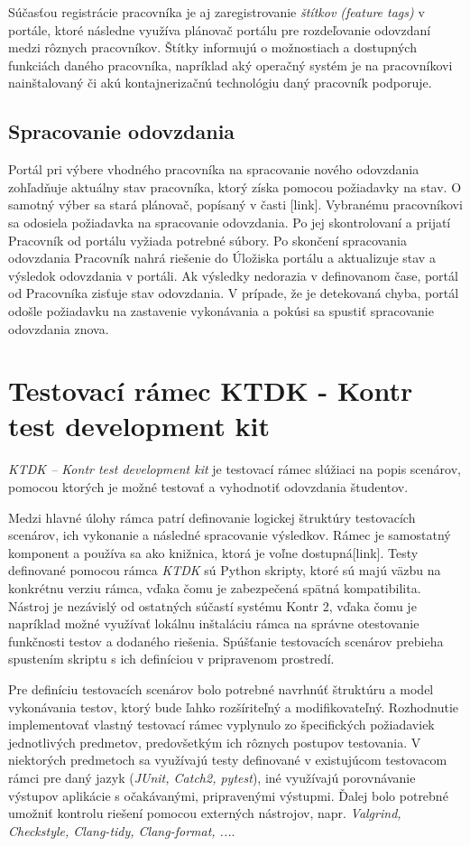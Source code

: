\documentclass[
  digital, %
  twoside, %
  table,   %
  lof,     %
  lot,     %
]{fithesis3}
\begin{document}
Súčasťou registrácie pracovníka je aj zaregistrovanie \emph{štítkov (feature tags)} v portále, ktoré následne využíva plánovač portálu pre rozdeľovanie odovzdaní medzi rôznych pracovníkov. Štítky informujú o možnostiach a dostupných funkciách daného pracovníka, napríklad aký operačný systém je na pracovníkovi nainštalovaný či akú kontajnerizačnú technológiu daný pracovník podporuje. 

\subsection{Spracovanie odovzdania}
Portál pri výbere vhodného pracovníka na spracovanie nového odovzdania zohľadňuje aktuálny stav pracovníka, ktorý získa pomocou požiadavky na stav. O samotný výber sa stará plánovač, popísaný v časti [link]. Vybranému pracovníkovi sa odosiela požiadavka na spracovanie odovzdania. Po jej skontrolovaní a prijatí Pracovník od portálu vyžiada potrebné súbory. Po skončení spracovania odovzdania Pracovník nahrá riešenie do Úložiska portálu a aktualizuje stav a výsledok odovzdania v portáli. Ak výsledky nedorazia v definovanom čase, portál od Pracovníka zisťuje stav odovzdania. V prípade, že je detekovaná chyba, portál odošle požiadavku na zastavenie vykonávania a pokúsi sa spustiť spracovanie odovzdania znova. 

\section{Testovací rámec KTDK - Kontr test development kit}

\emph{KTDK -- Kontr test development kit} je testovací rámec slúžiaci na popis scenárov, pomocou ktorých je možné testovať a vyhodnotiť odovzdania študentov.

Medzi hlavné úlohy rámca patrí definovanie logickej štruktúry testovacích scenárov, ich vykonanie a následné spracovanie výsledkov. Rámec je samostatný komponent a používa sa ako knižnica, ktorá je voľne dostupná[link]. Testy definované pomocou rámca \emph{KTDK} sú Python skripty, ktoré sú majú väzbu na konkrétnu verziu rámca, vďaka čomu je zabezpečená spätná kompatibilita. Nástroj je nezávislý od ostatných súčastí systému Kontr 2, vďaka čomu je napríklad možné využívať lokálnu inštaláciu rámca na správne otestovanie funkčnosti testov a dodaného riešenia. Spúšťanie testovacích scenárov prebieha spustením skriptu s ich definíciou v pripravenom prostredí. %

Pre definíciu testovacích scenárov bolo potrebné navrhnúť štruktúru a model vykonávania testov, ktorý bude ľahko rozšíriteľný a modifikovateľný. Rozhodnutie implementovať vlastný testovací rámec vyplynulo zo špecifických požiadaviek jednotlivých predmetov, predovšetkým ich rôznych postupov testovania. V niektorých predmetoch sa využívajú testy definované v existujúcom testovacom rámci pre daný jazyk (\emph{JUnit, Catch2, pytest}), iné využívajú porovnávanie výstupov aplikácie s očakávanými, pripravenými výstupmi. Ďalej bolo potrebné umožniť kontrolu riešení pomocou externých nástrojov, napr. \emph{Valgrind, Checkstyle, Clang-tidy, Clang-format, ...}.
\end{document}
